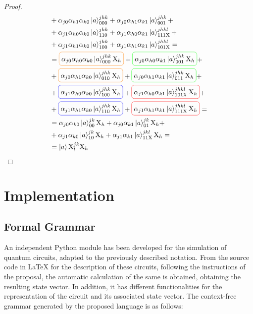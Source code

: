 \documentclass[sigconf,natbib=false]{acmart}
\begin{document}
\begin{proof}
\begin{align*}
			&+\alpha_{j0}\alpha_{h1}\alpha_{k0}\stateket{a}{jhk}{000} +
			  \alpha_{j0}\alpha_{h1}\alpha_{k1}\stateket{a}{jhk}{001}+\\
			&+\alpha_{j1}\alpha_{h0}\alpha_{k0}\stateket{a}{jhk}{110} +
			  \alpha_{j1}\alpha_{h0}\alpha_{k1}\stateket{a}{jhkl}{111\gate{X}}+\\
			&+\alpha_{j1}\alpha_{h1}\alpha_{k0}\stateket{a}{jhk}{100} +
			  \alpha_{j1}\alpha_{h1}\alpha_{k1}\stateket{a}{jhkl}{101\gate{X}}=\\
			&=\boxed{orange}{\alpha_{j0}\alpha_{h0}\alpha_{k0}\stateket{a}{jhk}{000}\gate{X}_h}+
			\boxed{green}{\alpha_{j0}\alpha_{h0}\alpha_{k1}\stateket{a}{jhk}{001}\gate{X}_h}+\\
			&+\boxed{orange}{\alpha_{j0}\alpha_{h1}\alpha_{k0}\stateket{a}{jhk}{010}\gate{X}_h}+
			\boxed{green}{\alpha_{j0}\alpha_{h1}\alpha_{k1}\stateket{a}{jhk}{011}\gate{X}_h}+\\
			&+\boxed{blue}{\alpha_{j1}\alpha_{h0}\alpha_{k0}\stateket{a}{jhk}{100}\gate{X}_h}+
			\boxed{red}{\alpha_{j1}\alpha_{h0}\alpha_{k1}\stateket{a}{jhkl}{101\gate{X}}\gate{X}_h}+\\
			&+\boxed{blue}{\alpha_{j1}\alpha_{h1}\alpha_{k0}\stateket{a}{jhk}{110}\gate{X}_h}+
			\boxed{red}{\alpha_{j1}\alpha_{h1}\alpha_{k1}\stateket{a}{jhkl}{111\gate{X}}\gate{X}_h}=\\
			&=\alpha_{j0}\alpha_{k0}\stateket{a}{jk}{00}\gate{X}_h+
			  \alpha_{j0}\alpha_{k1}\stateket{a}{jk}{01}\gate{X}_h+\\
			&+\alpha_{j1}\alpha_{k0}\stateket{a}{jk}{10}\gate{X}_h+
			  \alpha_{j1}\alpha_{k1}\stateket{a}{jkl}{11\gate{X}}\gate{X}_h=\\
			&=\ket{a}\stategate{X}{jk}{l}\gate{X}_h
		\end{align*}
	\end{proof}

	\section{Implementation}
    \subsection{Formal Grammar}
    An independent Python module has been developed for the simulation of quantum circuits, adapted to the previously described notation. From the source code in \LaTeX{} for the description of these circuits, following the instructions of the proposal, the automatic calculation of the same is obtained, obtaining the resulting state vector. In addition, it has different functionalities for the representation of the circuit and its associated state vector. The context-free grammar generated by the proposed language is as follows:
\end{document}
